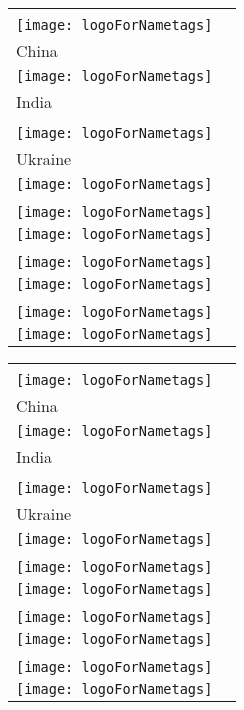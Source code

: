 \documentclass[a4paper,12pt]{article}%
\newcommand{\makeRowThree}[2]{
            \makeCellOne{#1}
            & 
            \makeCellOne{#2} \\ %
}
\newcommand{\makeCellOne}[1]{
    \begin{minipage}[t][50mm]{8.5cm}
        \begin{flushright}
        \hspace*{3cm}\\
        \texttt{[image: logoForNametags]}
        \end{flushright}
        {#1}
    \end{minipage}
}
\newcommand{\makeNames}[2]{
    \begin{center}
        \begin{minipage}[t][15mm]{8.5cm}
            \begin{center}
                \textsc{\LARGE{\textbf{#1}}}
            \end{center}
        \end{minipage}\\
        #2
    \end{center}
}
\newcommand{\makeOnePage}[1]{
\begin{minipage}{17cm}
\begin{tabular}{ | p{8.5cm} | p{8.5cm} | }
#1
\end{tabular}
\end{minipage}
\newpage
}
\begin{document}
\makeOnePage{
\hline\makeRowThree{
\makeNames{Namename Name}{China}
}{
\makeNames{Namename Namenamenamename Namename}{India}
}\hline\makeRowThree{
\makeNames{Namename Namename Namenamenamename}{Ukraine}
}{

}\hline\makeRowThree{

}{

}\hline\makeRowThree{

}{

}\hline\makeRowThree{

}{

}\hline}

\makeOnePage{
\hline\makeRowThree{
\makeNames{Namename Name}{China}
}{
\makeNames{Namename Namenamenamename Namename}{India}
}\hline\makeRowThree{
\makeNames{Namename Namename Namenamenamename}{Ukraine}
}{

}\hline\makeRowThree{

}{

}\hline\makeRowThree{

}{

}\hline\makeRowThree{

}{

}\hline}
\end{document}
